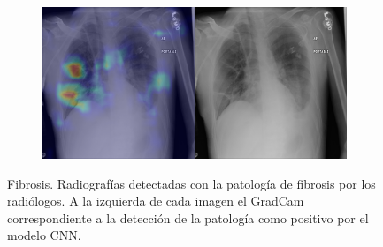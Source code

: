 \begin{figure}[b]
\begin{subfigure}{0.4\textwidth}
    \end{subfigure}
    \begin{subfigure}{0.4\textwidth}
        \centering
        \includegraphics[width=1.0\textwidth]{Chapters/5. Conclusiones/img/Fibrosis/1_1_00013993_125.png}
    \end{subfigure}

    \caption{Fibrosis. Radiografías detectadas con la patología de fibrosis por los
                    radiólogos. A la izquierda de cada imagen el GradCam correspondiente a la detección
                    de la patología como positivo por el modelo CNN.}
\end{figure}


